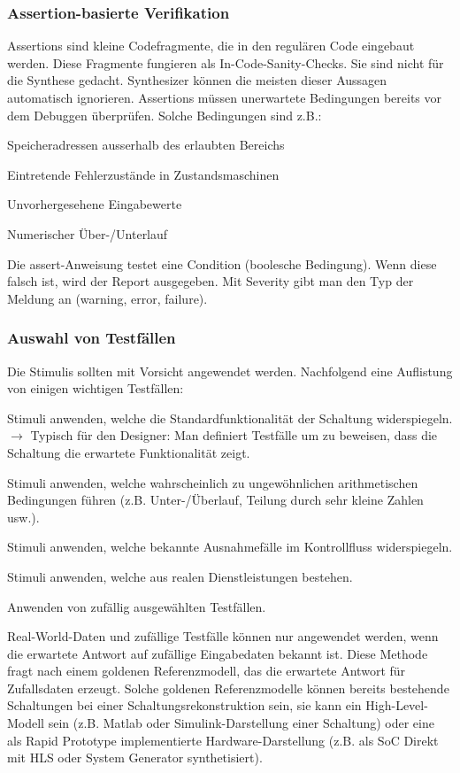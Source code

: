 \subsubsection{Assertion-basierte Verifikation}
Assertions sind kleine Codefragmente, die in den regulären Code eingebaut werden. Diese Fragmente fungieren als In-Code-Sanity-Checks. Sie sind nicht für die Synthese gedacht. Synthesizer können die meisten dieser Aussagen automatisch ignorieren.
Assertions müssen unerwartete Bedingungen bereits vor dem Debuggen überprüfen. Solche Bedingungen sind z.B.:
\begin{compactitem}
    \item Speicheradressen ausserhalb des erlaubten Bereichs
    \item Eintretende Fehlerzustände in Zustandsmaschinen 
    \item Unvorhergesehene Eingabewerte
    \item Numerischer Über-/Unterlauf
\end{compactitem}

Die assert-Anweisung testet eine Condition (boolesche Bedingung). Wenn diese falsch ist, wird der Report ausgegeben. Mit Severity gibt man den Typ der Meldung an (warning, error, failure).
\subsubsection{Auswahl von Testfällen}
Die Stimulis sollten mit Vorsicht angewendet werden. Nachfolgend eine Auflistung von einigen wichtigen Testfällen:
\begin{compactitem}
    \item Stimuli anwenden, welche die Standardfunktionalität der Schaltung widerspiegeln. $\rightarrow$ Typisch für den Designer: Man definiert Testfälle um zu beweisen, dass die Schaltung die erwartete Funktionalität zeigt.
    \item Stimuli anwenden, welche wahrscheinlich zu ungewöhnlichen arithmetischen Bedingungen führen (z.B. Unter-/Überlauf, Teilung durch sehr kleine Zahlen usw.).
    \item Stimuli anwenden, welche bekannte Ausnahmefälle im Kontrollfluss widerspiegeln.
    \item Stimuli anwenden, welche aus realen Dienstleistungen bestehen.
    \item Anwenden von zufällig ausgewählten Testfällen.
\end{compactitem}
Real-World-Daten und zufällige Testfälle können nur angewendet werden, wenn die erwartete Antwort auf zufällige Eingabedaten bekannt ist. Diese Methode fragt nach einem goldenen Referenzmodell, das die erwartete Antwort für Zufallsdaten erzeugt. Solche goldenen Referenzmodelle können bereits bestehende Schaltungen bei einer Schaltungsrekonstruktion sein, sie kann ein High-Level-Modell sein (z.B. Matlab oder Simulink-Darstellung einer Schaltung) oder eine als Rapid Prototype implementierte Hardware-Darstellung (z.B. als SoC Direkt mit HLS oder System Generator synthetisiert).
